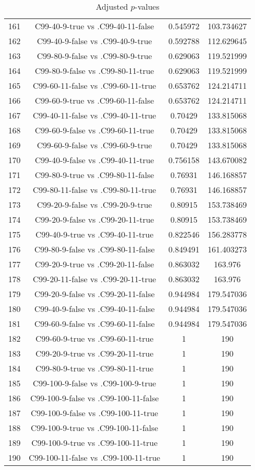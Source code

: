 \documentclass[a4paper,10pt]{article}
\begin{document}
\begin{landscape}
\begin{table}[!htp]
\begin{tabular}{cccc}
161&C99-40-9-true vs .C99-40-11-false&0.545972&103.734627\\
162&C99-40-9-false vs .C99-40-9-true&0.592788&112.629645\\
163&C99-80-9-false vs .C99-80-9-true&0.629063&119.521999\\
164&C99-80-9-false vs .C99-80-11-true&0.629063&119.521999\\
165&C99-60-11-false vs .C99-60-11-true&0.653762&124.214711\\
166&C99-60-9-true vs .C99-60-11-false&0.653762&124.214711\\
167&C99-40-11-false vs .C99-40-11-true&0.70429&133.815068\\
168&C99-60-9-false vs .C99-60-11-true&0.70429&133.815068\\
169&C99-60-9-false vs .C99-60-9-true&0.70429&133.815068\\
170&C99-40-9-false vs .C99-40-11-true&0.756158&143.670082\\
171&C99-80-9-true vs .C99-80-11-false&0.76931&146.168857\\
172&C99-80-11-false vs .C99-80-11-true&0.76931&146.168857\\
173&C99-20-9-false vs .C99-20-9-true&0.80915&153.738469\\
174&C99-20-9-false vs .C99-20-11-true&0.80915&153.738469\\
175&C99-40-9-true vs .C99-40-11-true&0.822546&156.283778\\
176&C99-80-9-false vs .C99-80-11-false&0.849491&161.403273\\
177&C99-20-9-true vs .C99-20-11-false&0.863032&163.976\\
178&C99-20-11-false vs .C99-20-11-true&0.863032&163.976\\
179&C99-20-9-false vs .C99-20-11-false&0.944984&179.547036\\
180&C99-40-9-false vs .C99-40-11-false&0.944984&179.547036\\
181&C99-60-9-false vs .C99-60-11-false&0.944984&179.547036\\
182&C99-60-9-true vs .C99-60-11-true&1&190\\
183&C99-20-9-true vs .C99-20-11-true&1&190\\
184&C99-80-9-true vs .C99-80-11-true&1&190\\
185&C99-100-9-false vs .C99-100-9-true&1&190\\
186&C99-100-9-false vs .C99-100-11-false&1&190\\
187&C99-100-9-false vs .C99-100-11-true&1&190\\
188&C99-100-9-true vs .C99-100-11-false&1&190\\
189&C99-100-9-true vs .C99-100-11-true&1&190\\
190&C99-100-11-false vs .C99-100-11-true&1&190\\
\hline
\end{tabular}
\caption{Adjusted $p$-values}
\end{table}

\end{landscape}
\end{document}
